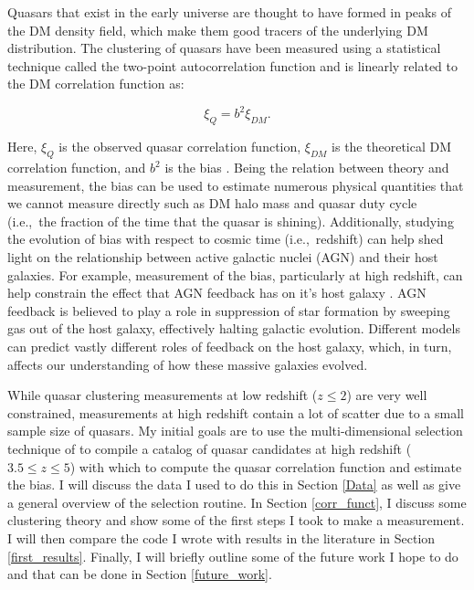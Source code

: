 \documentclass[onecolumn]{emulateapj}
\begin{document}
Quasars that exist in the early universe are thought to have formed in peaks of the DM density field, which make them good tracers of the underlying DM distribution. The clustering of quasars have been measured using a statistical technique called the two-point autocorrelation function and is linearly related to the DM correlation function as:

\begin{equation}
\xi_Q = b^2 \xi_{DM} .
\end{equation}\label{bias}

Here, $\xi_Q$ is the observed quasar correlation function, $\xi_{DM}$ is the theoretical DM correlation function, and $b^2$ is the bias \citep{Peebles1980}. Being the relation between theory and measurement, the bias can be used to estimate numerous physical quantities that we cannot measure directly such as DM halo mass and quasar duty cycle (i.e.,\ the fraction of the time that the quasar is shining). Additionally, studying the evolution of bias with respect to cosmic time (i.e.,\ redshift) can help shed light on the relationship between active galactic nuclei (AGN) and their host galaxies. For example, measurement of the bias, particularly at high redshift, can help constrain the effect that AGN feedback has on it's host galaxy \citep{Hopkins2007a}. AGN feedback is believed to play a role in suppression of star formation by sweeping gas out of the host galaxy, effectively halting galactic evolution. Different models can predict vastly different roles of feedback on the host galaxy, which, in turn, affects our understanding of how these massive galaxies evolved.

While quasar clustering measurements at low redshift ($z\le2$) are very well constrained, measurements at high redshift contain a lot of scatter due to a small sample size of quasars. My initial goals are to use the multi-dimensional selection technique of \citet{Richards2015} to compile a catalog of quasar candidates at high redshift ($3.5\le z\le5$) with which to compute the quasar correlation function and estimate the bias. I will discuss the data I used to do this in Section \ref{Data} as well as give a general overview of the selection routine. In Section \ref{corr_funct}, I discuss some clustering theory and show some of the first steps I took to make a measurement. I will then compare the code I wrote with results in the literature in Section \ref{first_results}. Finally, I will briefly outline some of the future work I hope to do and that can be done in Section \ref{future_work}.  
\end{document}
